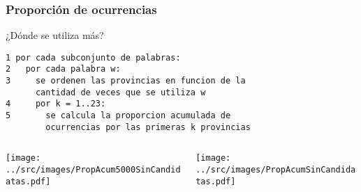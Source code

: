 \begin{frame}[fragile]\frametitle{Proporción de ocurrencias}
    ¿Dónde se utiliza más?
\begin{lstlisting}
1 por cada subconjunto de palabras:
2   por cada palabra w:
3     se ordenen las provincias en funcion de la 
      cantidad de veces que se utiliza w
4     por k = 1..23:
5       se calcula la proporcion acumulada de 
        ocurrencias por las primeras k provincias
\end{lstlisting}
\begin{columns}
\begin{column}{.5\linewidth}
\centering
\texttt{[image: ../src/images/PropAcum5000SinCandidatas.pdf]}
\end{column}
\begin{column}{.5\linewidth}
\centering
\texttt{[image: ../src/images/PropAcumSinCandidatas.pdf]}
\end{column}
\end{columns}
           

\end{frame}